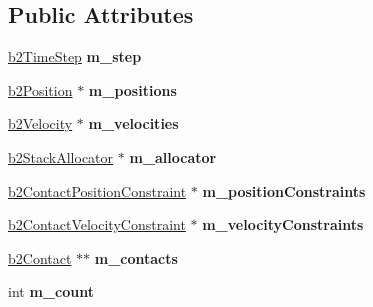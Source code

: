 \subsection*{Public Attributes}
\begin{DoxyCompactItemize}
\item 
\hypertarget{classb2_contact_solver_aac78600ba5fd3249bac20678cbc9f101}{\hyperlink{structb2_time_step}{b2\-Time\-Step} {\bfseries m\-\_\-step}}\label{classb2_contact_solver_aac78600ba5fd3249bac20678cbc9f101}

\item 
\hypertarget{classb2_contact_solver_a39b973c8311e522f44cda9053dcea5a8}{\hyperlink{structb2_position}{b2\-Position} $\ast$ {\bfseries m\-\_\-positions}}\label{classb2_contact_solver_a39b973c8311e522f44cda9053dcea5a8}

\item 
\hypertarget{classb2_contact_solver_aae6dae9341dbbd780e7b3ec6b1b332f9}{\hyperlink{structb2_velocity}{b2\-Velocity} $\ast$ {\bfseries m\-\_\-velocities}}\label{classb2_contact_solver_aae6dae9341dbbd780e7b3ec6b1b332f9}

\item 
\hypertarget{classb2_contact_solver_a6a2c9f5470a469e50d7f33f8d9095abe}{\hyperlink{classb2_stack_allocator}{b2\-Stack\-Allocator} $\ast$ {\bfseries m\-\_\-allocator}}\label{classb2_contact_solver_a6a2c9f5470a469e50d7f33f8d9095abe}

\item 
\hypertarget{classb2_contact_solver_ac0f4106f7cf67d185a7a4f3fd5a4e4ce}{\hyperlink{structb2_contact_position_constraint}{b2\-Contact\-Position\-Constraint} $\ast$ {\bfseries m\-\_\-position\-Constraints}}\label{classb2_contact_solver_ac0f4106f7cf67d185a7a4f3fd5a4e4ce}

\item 
\hypertarget{classb2_contact_solver_a616319ffa7ceb509b8189f07a070f7c7}{\hyperlink{structb2_contact_velocity_constraint}{b2\-Contact\-Velocity\-Constraint} $\ast$ {\bfseries m\-\_\-velocity\-Constraints}}\label{classb2_contact_solver_a616319ffa7ceb509b8189f07a070f7c7}

\item 
\hypertarget{classb2_contact_solver_aa1c7370d1d2681f9d49a494f9b0a38c6}{\hyperlink{classb2_contact}{b2\-Contact} $\ast$$\ast$ {\bfseries m\-\_\-contacts}}\label{classb2_contact_solver_aa1c7370d1d2681f9d49a494f9b0a38c6}

\item 
\hypertarget{classb2_contact_solver_ab5b74c0fadf0d5d8997700b5ff91ea91}{int {\bfseries m\-\_\-count}}\label{classb2_contact_solver_ab5b74c0fadf0d5d8997700b5ff91ea91}

\end{DoxyCompactItemize}


